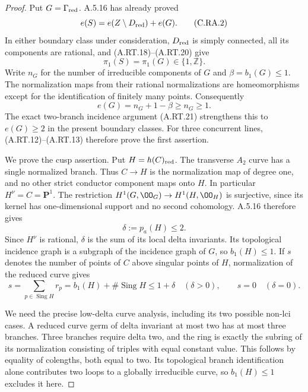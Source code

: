 \begin{proof}
Put $G=\Gamma_{\rm red}$. A.5.16 has already proved
\[
 e(S)=e(Z\setminus D_{\rm red})+e(G).             \tag{C.RA.2}
\]
In either boundary class under consideration, $D_{\rm red}$
is simply connected, all its components are rational, and
(A.RT.18)--(A.RT.20) give
\[
 \pi_1(S)=\pi_1(G)\in\{1,\mathbb Z\}.
 \tag{C.RA.3}
\]
Write $n_G$ for the number of irreducible components of $G$
and $\beta=b_1(G)\le1$. The normalization maps from their
rational normalizations are homeomorphisms except for the
identification of finitely many points. Consequently
\[
                   e(G)=n_G+1-\beta\ge n_G\ge1.
 \tag{C.RA.4}
\]
The exact two-branch incidence argument (A.RT.21) strengthens
this to $e(G)\ge2$ in the present boundary classes.
For three concurrent lines, (A.RT.12)--(A.RT.13) therefore
prove the first assertion.

We prove the cusp assertion. Put $H=h(C)_{\rm red}$.
The transverse $A_2$ curve has a single normalized branch.
Thus $C\to H$ is the normalization map of degree one, and
no other strict conductor component maps onto $H$.
In particular $H^\nu=C=\mathbf P^1$. The restriction
$H^1(G,\OO_G)\to H^1(H,\OO_H)$ is surjective, since its
kernel has one-dimensional support and no second cohomology.
A.5.16 therefore gives
\[
              \delta:=p_a(H)\le2.              \tag{C.RA.5}
\]
Since $H^\nu$ is rational, $\delta$ is the sum of its local
delta invariants. Its topological incidence graph is a
subgraph of the incidence graph of $G$, so $b_1(H)\le1$.
If $s$ denotes the number of points of $C$ above singular
points of $H$, normalization of the reduced curve gives
\[
 s=\sum_{p\in\operatorname{Sing}H}r_p
   =b_1(H)+\#\operatorname{Sing}H\le1+\delta
 \quad(\delta>0),\qquad s=0\quad(\delta=0).       \tag{C.RA.6}
\]

We need the precise low-delta curve analysis, including its
two possible non-lci cases. A reduced curve germ of delta
invariant at most two has at most three branches.
Three branches require delta two, and the ring is exactly
the subring of its normalization consisting of triples
with equal constant value. This follows by equality of
colengths, both equal to two. Its topological branch
identification alone contributes two loops to a globally
irreducible curve, so $b_1(H)\le1$ excludes it here.


\end{proof}
